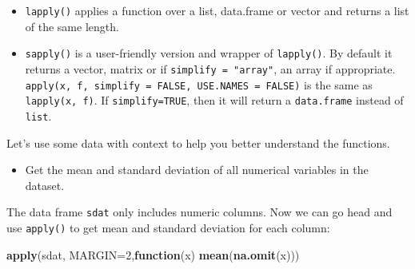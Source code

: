 \documentclass[12pt,]{krantz}
\makeatletter
\newenvironment{Shaded}{\begin{snugshade}}{\end{snugshade}}
\newcommand{\CommentTok}[1]{\textcolor[rgb]{0.37,0.37,0.37}{\textit{#1}}}
\newcommand{\ControlFlowTok}[1]{\textcolor[rgb]{0.27,0.27,0.27}{\textbf{#1}}}
\newcommand{\DataTypeTok}[1]{\textcolor[rgb]{0.27,0.27,0.27}{#1}}
\newcommand{\DecValTok}[1]{\textcolor[rgb]{0.06,0.06,0.06}{#1}}
\newcommand{\KeywordTok}[1]{\textcolor[rgb]{0.27,0.27,0.27}{\textbf{#1}}}
\newcommand{\NormalTok}[1]{#1}
\newcommand{\OperatorTok}[1]{\textcolor[rgb]{0.43,0.43,0.43}{\textbf{#1}}}
\newcommand{\StringTok}[1]{\textcolor[rgb]{0.5,0.5,0.5}{#1}}
\providecommand{\tightlist}{%
  \setlength{\itemsep}{0pt}\setlength{\parskip}{0pt}}
\newenvironment{kframe}{%
\medskip{}
\setlength{\fboxsep}{.8em}
 \def\at@end@of@kframe{}%
 \ifinner\ifhmode%
  \def\at@end@of@kframe{\end{minipage}}%
  \begin{minipage}{\columnwidth}%
 \fi\fi%
 \def\FrameCommand##1{\hskip\@totalleftmargin \hskip-\fboxsep
 \colorbox{shadecolor}{##1}\hskip-\fboxsep
     \hskip-\linewidth \hskip-\@totalleftmargin \hskip\columnwidth}%
 \MakeFramed {\advance\hsize-\width
   \@totalleftmargin\z@ \linewidth\hsize
   \@setminipage}}%
 {\par\unskip\endMakeFramed%
 \at@end@of@kframe}
\renewenvironment{Shaded}{\begin{kframe}}{\end{kframe}}
\makeatother
\begin{document}
\begin{itemize}
\tightlist
\item
  \texttt{lapply()} applies a function over a list, data.frame or vector and returns a list of the same length.
\item
  \texttt{sapply()} is a user-friendly version and wrapper of \texttt{lapply()}. By default it returns a vector, matrix or if \texttt{simplify\ =\ "array"}, an array if appropriate. \texttt{apply(x,\ f,\ simplify\ =\ FALSE,\ USE.NAMES\ =\ FALSE)} is the same as \texttt{lapply(x,\ f)}. If \texttt{simplify=TRUE}, then it will return a \texttt{data.frame} instead of \texttt{list}.
\end{itemize}

Let's use some data with context to help you better understand the functions.

\begin{itemize}
\tightlist
\item
  Get the mean and standard deviation of all numerical variables in the dataset.
\end{itemize}

\begin{Shaded}
\end{Shaded}

The data frame \texttt{sdat} only includes numeric columns. Now we can go head and use \texttt{apply()} to get mean and standard deviation for each column:

\begin{Shaded}
\begin{Highlighting}[]
\KeywordTok{apply}\NormalTok{(sdat, }\DataTypeTok{MARGIN=}\DecValTok{2}\NormalTok{,}\ControlFlowTok{function}\NormalTok{(x) }\KeywordTok{mean}\NormalTok{(}\KeywordTok{na.omit}\NormalTok{(x)))}
\end{Highlighting}
\end{Shaded}
\end{document}
